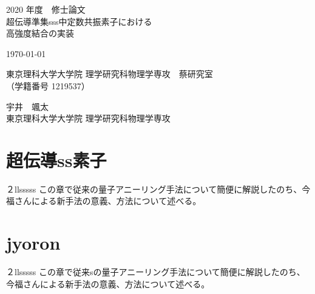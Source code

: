 \documentclass[uplatex,openany,oneside,a4j,11pt]{jsbook}
\begin{document}
\begin{titlepage}
    \begin{center}
        {\Large 2020 年度　修士論文}\\
        \vspace{180truept}
        {\Huge 超伝導準集sss中定数共振素子における\\
        \vspace{10truept}
        高強度結合の実装}\\ 
        \vspace{70truept}

        {\Large \today}\\

        \vspace{70truept}

        {\Large 東京理科大学大学院 理学研究科物理学専攻　蔡研究室\\
        （学籍番号 1219537）}\\

        \vspace{20truept}

        {\huge 宇井　颯太}\\

        \vspace{160truept}
        {\Large 東京理科大学大学院 理学研究科物理学専攻}\\
    \end{center}
\end{titlepage}

\tableofcontents

\chapter{超伝導ss素子}
        ２llsssss
        この章で従来の\cite{nakamura1999coherent}量子アニーリング手法について簡便に解説したのち、今福さんによる新手法の意義、方法について述べる。\\
    

\chapter{jyoron}
    ２llsssss
    この章で従来sの\cite{nakamura1999coherent}量子アニーリング手法について簡便に解説したのち、今福さんによる新手法の意義、方法について述べる。\\
    
\end{document}
